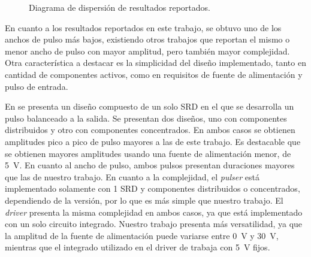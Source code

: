 \begin{figure}
\centering
{}
  \caption{Diagrama de dispersión de resultados reportados.}
  \label{fig:scatterplot_literature}
\end{figure}

En cuanto a los resultados reportados en este trabajo, se obtuvo uno de los
anchos de pulso más bajos, existiendo otros trabajos que reportan el mismo o
menor ancho de pulso con mayor amplitud, pero también mayor complejidad. Otra
característica a destacar es la simplicidad del diseño implementado, tanto en
cantidad de componentes activos, como en requisitos de fuente de alimentación y
pulso de entrada.

En \cite{rulikowski2004} se presenta un diseño compuesto de un solo SRD en el
que se desarrolla un pulso balanceado a la salida. Se presentan dos diseños, uno
con componentes distribuidos y otro con componentes concentrados. En ambos casos
se obtienen amplitudes pico a pico de pulso mayores a las de este trabajo. Es
destacable que se obtienen mayores amplitudes usando una fuente de alimentación
menor, de \qty{5}{\volt}. En cuanto al ancho de pulso, ambos pulsos presentan
duraciones mayores que las de nuestro trabajo. En cuanto a la complejidad, el
\textit{pulser} está implementado solamente con 1 SRD y componentes
distribuidos o concentrados, dependiendo de la versión, por lo que es más simple
que nuestro trabajo. El \textit{driver} presenta la misma complejidad en ambos
casos, ya que está implementado con un solo circuito integrado. Nuestro trabajo
presenta más versatilidad, ya que la amplitud de la fuente de alimentación puede
variarse entre \qty{0}{\volt} y \qty{30}{\volt}, mientras que el integrado
utilizado en el driver de \cite{rulikowski2004} trabaja con \qty{5}{\volt}
fijos.

